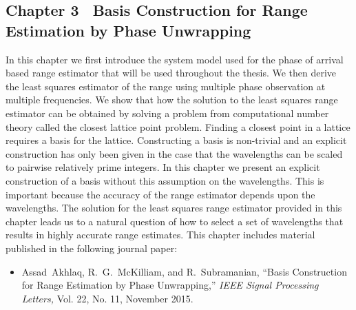 \subsection*{Chapter 3 \textemdash~Basis Construction for Range Estimation by Phase Unwrapping}
In this chapter we first introduce the system model used for the phase of arrival based range estimator that will be used throughout the thesis. We then derive the least squares estimator of the range using multiple phase observation at multiple frequencies. We show that how the solution to the least squares range estimator can be obtained by solving a problem from computational number theory called the closest lattice point problem. Finding a closest point in a lattice requires a basis for the lattice. Constructing a basis is non-trivial and an explicit construction has only been given in the case that the wavelengths can be scaled to pairwise relatively prime integers. In this chapter we present an explicit construction of a basis without this assumption on the wavelengths. This is important because the accuracy of the range estimator depends upon the wavelengths. The solution for the least squares range estimator provided in this chapter leads us to a natural question of how to select a set of wavelengths that results in highly accurate range estimates.
\newline
This chapter includes material published in the following journal paper:
\newline
\begin{itemize}
\item{Assad~Akhlaq, R.~G.~McKilliam, and R.~Subramanian, ``{Basis Construction for Range Estimation by Phase Unwrapping},'' \emph{IEEE Signal Processing Letters,}  Vol. 22, No. 11, November 2015.}
\end{itemize}

